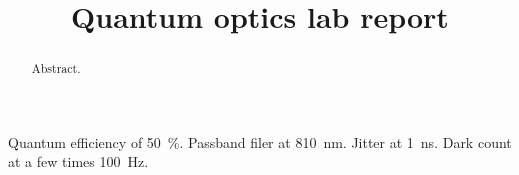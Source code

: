 \documentclass[11pt]{article}
\title{Quantum optics lab report}
\begin{document}
\maketitle

\begin{abstract}
Abstract.
\end{abstract}

Quantum efficiency of \SI{50}{\percent}.
Passband filer at \SI{810}{nm}. 
Jitter at \SI{1}{ns}. 
Dark count at a few times \SI{100}{Hz}. 







\printbibliography
\end{document}
